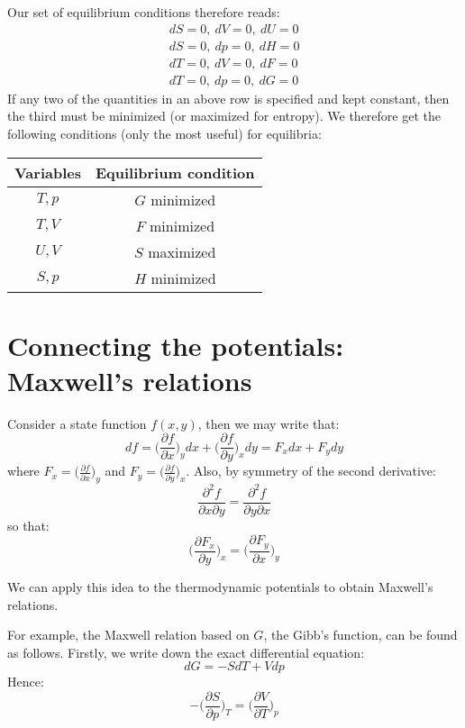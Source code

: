 \documentclass[a4paper,11pt,oneside]{book}
\begin{document}
Our set of equilibrium conditions therefore reads:
\begin{align}
    dS = 0, \ dV = 0, \ dU = 0\\
    dS = 0, \ dp = 0, \ dH = 0\\
    dT = 0, \ dV = 0, \ dF = 0\\
    dT = 0, \ dp = 0, \ dG = 0
\end{align}
If any two of the quantities in an above row is specified and kept constant, then the third must be minimized (or maximized for entropy). We therefore get the following conditions (only the most useful) for equilibria:
\begin{table}[h!]
    \centering
    \begin{tabular}{c|c}
    Variables & Equilibrium condition \\
    \hline 
        $T,p$ & $G$ minimized \\
        $T,V$ & $F$ minimized \\
        $U,V$ & $S$ maximized \\
        $S,p$ & $H$ minimized
    \end{tabular}
    \label{tab:my_label}
\end{table}
\section{Connecting the potentials: Maxwell's relations}
Consider a state function $f(x,y)$, then we may write that:
\begin{equation}
    df = \bigg(\frac{\partial f}{\partial x}\bigg)_y dx + \bigg(\frac{\partial f}{\partial y}\bigg)_x dy = F_x dx + F_y dy
\end{equation}
where $F_x = \big(\frac{\partial f}{\partial x}\big)_y$ and $F_y = \big(\frac{\partial f}{\partial y}\big)_x$. Also, by symmetry of the second derivative:
\begin{equation}
    \frac{\partial^2 f}{\partial x \partial y}= \frac{\partial^2 f}{\partial y \partial x}
\end{equation}
so that:
\begin{equation}
    \bigg(\frac{\partial F_x}{\partial y}\bigg)_x =   \bigg(\frac{\partial F_y}{\partial x}\bigg)_y
\end{equation}


We can apply this idea to the thermodynamic potentials to obtain Maxwell's relations. 


For example, the Maxwell relation based on $G$, the Gibb's function, can be found as follows. Firstly, we write down the exact differential equation:
\begin{equation}
    dG = -SdT + Vdp
\end{equation}
Hence:
\begin{equation}
    -  \bigg(\frac{\partial S}{\partial p}\bigg)_T =   \bigg(\frac{\partial V}{\partial T}\bigg)_p
\end{equation}
\end{document}
